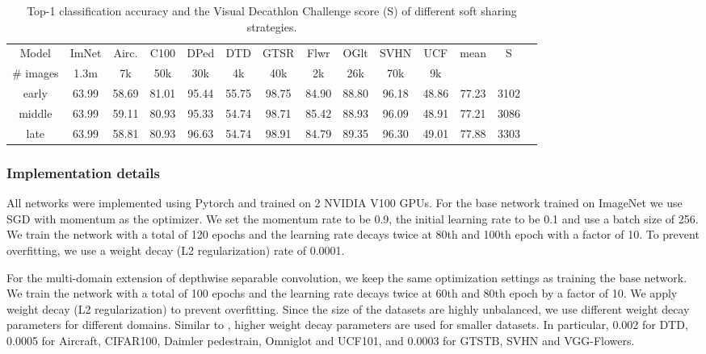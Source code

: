 \documentclass[letterpaper]{article} \usepackage{aaai19}  \usepackage{times}  \usepackage{helvet}  \usepackage{courier}  \usepackage{url}  \usepackage{graphicx}  \usepackage{amssymb}
\begin{document}
\bgroup
\def\arraystretch{1.2}\begin{table*}[!htb]
	\small
	\begin{center}
		\begin{tabular}{c c c c c c c c c c c c c c} 
			
		    Model	 & ImNet  & Airc. & C100  & DPed & DTD & GTSR & Flwr & OGlt & SVHN  &UCF  & mean & S \\
			
			\# images & 1.3m & 7k &50k& 30k& 4k &40k& 2k &26k& 70k& 9k \\
			\hline
    
    		early  &  63.99& 58.69  & 81.01  & 95.44 & 55.75 &  98.75& 84.90 & 88.80  & 96.18  & 48.86  & 77.23 & 3102\\
    
    		 middle  &  63.99& 59.11  & 80.93  & 95.33 & 54.74 &  98.71&  85.42& 88.93  & 96.09  &  48.91 & 77.21 & 3086\\
    		
    		 late  &  63.99&  58.81  & 80.93 & 96.63 & 54.74  & 98.91  & 84.79  & 89.35 &  96.30 & 49.01 & 77.88 & 3303 \\
			\hline 
		\end{tabular}
	\end{center}
		\caption{ {\textnormal{Top-1 classification accuracy and the Visual Decathlon Challenge score (S) of different soft sharing strategies.}}}
	\label{Table: transfer}
\end{table*}
\subsubsection{Implementation details}
All networks were implemented using Pytorch and trained on 2 NVIDIA V100 GPUs. For the base network trained on ImageNet we use SGD with momentum as the optimizer. We set the momentum rate to be 0.9, the initial learning rate to be 0.1 and use a batch size of 256. We train the network with a total of 120 epochs and the learning rate decays twice at 80th and 100th epoch with a factor of 10. To prevent overfitting, we use a weight decay (L2 regularization) rate of 0.0001.

For the multi-domain extension of depthwise separable convolution, we keep the same optimization settings as training the base network. We train the network with a total of 100 epochs and the learning rate decays twice at 60th and 80th epoch by a factor of 10. We apply weight
decay (L2 regularization) to prevent overfitting. Since the size of the datasets are highly unbalanced, we use different weight decay parameters for different domains. Similar to \cite{rebuffi18efficient}, higher weight decay parameters are used for smaller datasets. In particular, 0.002 for DTD, 0.0005 for Aircraft, CIFAR100, Daimler pedestrain, Omniglot and UCF101, and 0.0003 for GTSTB, SVHN and VGG-Flowers. 
\end{document}
